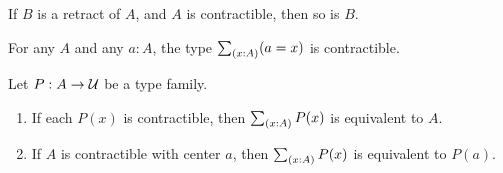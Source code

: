 \documentclass[hott-all.tex]{subfiles}
\begin{document}
\begin{lem}
  If $B$ is a retract of $A$, and $A$ is contractible, then so is $B$.
\end{lem}
%


\begin{lem}
  For any $A$ and any $a:A$, the type $\sm{x:A} (a=x)$ is contractible.
\end{lem}
%

\begin{lem}
  Let $P:A\to\mathcal{U}$ be a type family.
  \begin{enumerate}
  \item If each $P(x)$ is contractible, then $\sm{x:A} P(x)$ is equivalent to $A$.
  \item If $A$ is contractible with center $a$, then $\sm{x:A} P(x)$ is equivalent to $P(a)$.
  \end{enumerate}
\end{lem}
%
\end{document}
